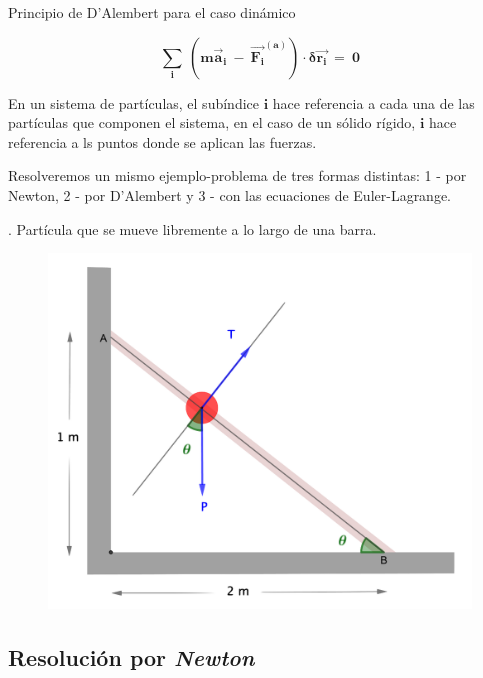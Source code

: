 \begin{myalertblock}{Principio de D'Alembert para el caso dinámico}	
\begin{large}
\begin{equation}
\label{DAD2}
\boldsymbol{ \displaystyle \sum_i \ \left( m \overrightarrow a_i \ - \ \overrightarrow{F_i}^{(a)} \right ) \cdot \delta \overrightarrow{r_i}	 \ = \ 0 }
\end{equation}
\end{large}
\end{myalertblock}

En un sistema de partículas, el subíndice $\boldsymbol i$ hace referencia a cada una de las partículas que componen el sistema, en el caso de un sólido rígido, $\boldsymbol i$ hace referencia a ls puntos donde se aplican las fuerzas.

Resolveremos un mismo ejemplo-problema de tres formas distintas: 1 - por Newton, 2 - por D'Alembert y 3 - con las ecuaciones de Euler-Lagrange.

\vspace{1cm}
\begin{example}
.	Partícula que se mueve libremente a lo largo de una barra.

\begin{figure}[H]
	\centering
	\includegraphics[width=.6\textwidth]{imagenes/img02-01.png}
\end{figure}
\end{example}

\vspace{1cm}
\subsection{Resolución por \emph{Newton}}
	
